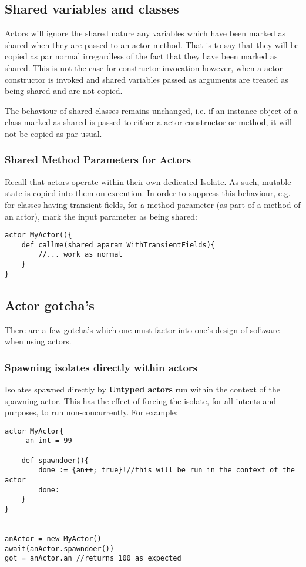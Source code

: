 \documentclass[conc-doc]{subfiles}
\begin{document}
\subsection{Shared variables and classes}
Actors will ignore the shared nature any variables which have been marked as shared when they are passed to an actor method. That is to say that they will be copied as par normal irregardless of the fact that they have been marked as shared. This is not the case for constructor invocation however, when a actor constructor is invoked and shared variables passed as arguments are treated as being shared and are not copied.

The behaviour of shared classes remains unchanged, i.e. if an instance object of a class marked as shared is passed to either a actor constructor or method, it will not be copied as par usual.

\subsubsection{Shared Method Parameters for Actors}
Recall that actors operate within their own dedicated Isolate. As such, mutable state is copied into them on execution. In order to suppress this behaviour, e.g. for classes having transient fields, for a method parameter (as part of a method of an actor), mark the input parameter as being shared:

\begin{lstlisting}
actor MyActor(){
	def callme(shared aparam WithTransientFields){
		//... work as normal
	}
}
\end{lstlisting}

\subsection{Actor gotcha's}
There are a few gotcha's which one must factor into one's design of software when using actors. 

\subsubsection{Spawning isolates directly within actors}

Isolates spawned directly by \textbf{Untyped actors} run within the context of the spawning actor. This has the effect of forcing the isolate, for all intents and purposes, to run non-concurrently. For example:

\begin{lstlisting}
actor MyActor{
	-an int = 99
	
	def spawndoer(){
		done := {an++; true}!//this will be run in the context of the actor
		done:
	}
}


anActor = new MyActor()
await(anActor.spawndoer())
got = anActor.an //returns 100 as expected
\end{lstlisting}
\end{document}
